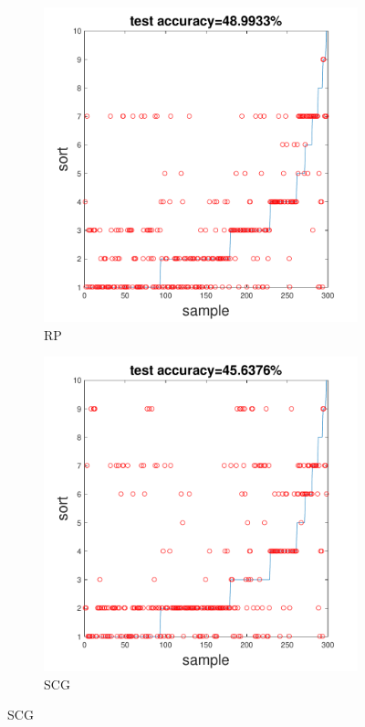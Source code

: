 \documentclass[12pt,a4paper]{article}
\begin{document}
\begin{CJK}{UTF8}{bsmi}
\begin{enumerate}
\begin{enumerate}
	 	\begin{figure}[H]
	 		\centering
	 		\begin{subfigure}{.5\textwidth}
	 			\centering
	 			\includegraphics[width=1.05\linewidth]{yeast_rp}
	 			\caption{RP}
	 			
	 		\end{subfigure}%
	 		\begin{subfigure}{.5\textwidth}
	 			\centering
	 			\includegraphics[width=1.05\linewidth]{yeast_scg}
	 			\caption{SCG}
	 			

\end{subfigure}
\end{figure}
\end{enumerate}
\end{enumerate}
\end{CJK}
\end{document}
